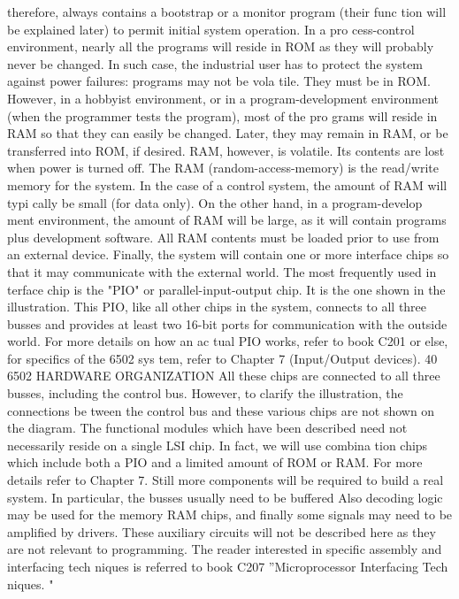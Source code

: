 therefore, always contains a bootstrap or a monitor program (their func
tion will be explained later) to permit initial system operation. In a pro
cess-control environment, nearly all the programs will reside in ROM as
they will probably never be changed. In such case, the industrial user has
to protect the system against power failures: programs may not be vola
tile. They must be in ROM.
However, in a hobbyist environment, or in a program-development
environment (when the programmer tests the program), most of the pro
grams will reside in RAM so that they can easily be changed. Later, they
may remain in RAM, or be transferred into ROM, if desired. RAM,
however, is volatile. Its contents are lost when power is turned off.
The RAM (random-access-memory) is the read/write memory for the
system. In the case of a control system, the amount of RAM will typi
cally be small (for data only). On the other hand, in a program-develop
ment environment, the amount of RAM will be large, as it will contain
programs plus development software. All RAM contents must be loaded
prior to use from an external device.
Finally, the system will contain one or more interface chips so that it
may communicate with the external world. The most frequently used in
terface chip is the "PIO" or parallel-input-output chip. It is the one
shown in the illustration. This PIO, like all other chips in the system,
connects to all three busses and provides at least two 16-bit ports for
communication with the outside world. For more details on how an ac
tual PIO works, refer to book C201 or else, for specifics of the 6502 sys
tem, refer to Chapter 7 (Input/Output devices).
40
6502 HARDWARE ORGANIZATION
All these chips are connected to all three busses, including the
control bus. However, to clarify the illustration, the connections be
tween the control bus and these various chips are not shown on the
diagram.
The functional modules which have been described need not
necessarily reside on a single LSI chip. In fact, we will use combina
tion chips which include both a PIO and a limited amount of ROM
or RAM. For more details refer to Chapter 7.
Still more components will be required to build a real system. In
particular, the busses usually need to be buffered Also decoding
logic may be used for the memory RAM chips, and finally some
signals may need to be amplified by drivers. These auxiliary circuits
will not be described here as they are not relevant to programming.
The reader interested in specific assembly and interfacing tech
niques is referred to book C207 ''Microprocessor Interfacing Tech
niques. "
